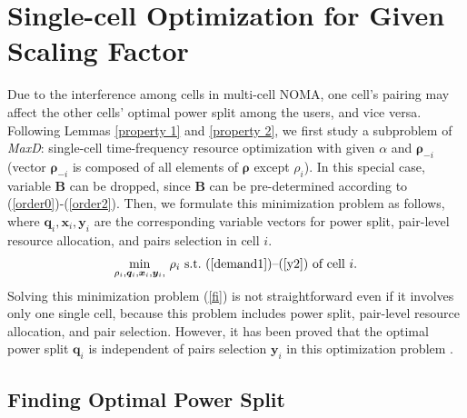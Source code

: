 \documentclass[10pt,journal,final,finalsubmission,twocolumn]{IEEEtran}
\begin{document}
\section{Single-cell Optimization for Given Scaling Factor}\label{CellLoadsMinimization}

Due to the interference among cells in multi-cell NOMA, one cell's pairing may affect the other cells' optimal power split among the users, and vice versa. Following Lemmas \ref{property 1} and \ref{property 2}, we first study a subproblem of {\em MaxD}: single-cell time-frequency resource optimization with given $\alpha$ and $\boldsymbol{\rho}_{-i}$ (vector $\boldsymbol{\rho}_{-i}$ is composed of all elements of $\boldsymbol{\rho}$ except $\rho_i$). In this special case, variable $\boldsymbol{B}$ can be dropped, since $\boldsymbol{B}$ can be pre-determined according to (\ref{order0})-(\ref{order2}). Then, we formulate this minimization problem as follows, where $\boldsymbol{q}_i,\boldsymbol{x}_i,\boldsymbol{y}_i$ are the corresponding variable vectors for power split, pair-level resource allocation, and pairs selection in cell $i$.
\begin{equation}\label{fi}
 \underset{\rho_i, \boldsymbol{q}_i,\boldsymbol{x}_i,\boldsymbol{y}_i,}{\min} \  \rho_i \ \textup{s.t.\ (\ref{demand1})--(\ref{y2}) of cell $i$} .
\end{equation}
Solving this minimization problem (\ref{fi}) is not straightforward even if it involves only one single cell, because this problem includes power split,  pair-level resource allocation, and pair selection. However, it has been proved that the optimal power split $\boldsymbol{q}_i$ is independent of pairs selection $\boldsymbol{y}_i$ in this optimization problem \cite[Theorem 1]{You1}.



\subsection{Finding Optimal Power Split}\label{OptimalPowerSplit}
\end{document}
